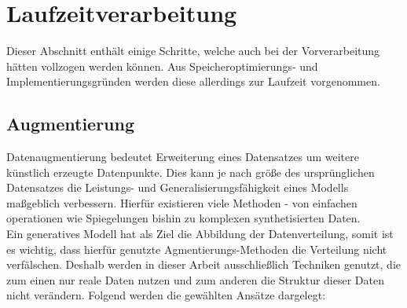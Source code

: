 \section{Laufzeitverarbeitung}

Dieser Abschnitt enthält einige Schritte, welche auch bei der Vorverarbeitung hätten vollzogen werden können. Aus Speicheroptimierungs- und Implementierungsgründen werden diese allerdings zur Laufzeit vorgenommen.


\subsection{Augmentierung}
\label{subsec:Augmentierung}

Datenaugmentierung bedeutet Erweiterung eines Datensatzes um weitere künstlich erzeugte Datenpunkte. Dies kann je nach größe des ursprünglichen Datensatzes die Leistungs- und Generalisierungsfähigkeit eines Modells maßgeblich verbessern. Hierfür existieren viele Methoden - von einfachen operationen wie Spiegelungen bishin zu komplexen synthetisierten Daten. \\
Ein generatives Modell hat als Ziel die Abbildung der Datenverteilung, somit ist es wichtig, dass hierfür genutzte Agmentierungs-Methoden die Verteilung nicht verfälschen. Deshalb werden in dieser Arbeit ausschließlich Techniken genutzt, die zum einen nur reale Daten nutzen und zum anderen die Struktur dieser Daten nicht verändern. Folgend werden die gewählten Ansätze dargelegt:
